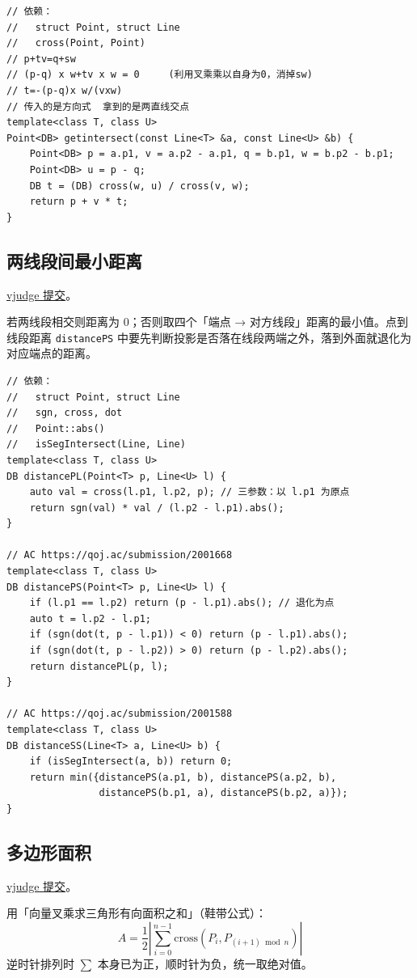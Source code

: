 		\begin{verbatim}
// 依赖：
//   struct Point, struct Line
//   cross(Point, Point)
// p+tv=q+sw
// (p-q) x w+tv x w = 0     (利用叉乘乘以自身为0，消掉sw)
// t=-(p-q)x w/(vxw)
// 传入的是方向式  拿到的是两直线交点
template<class T, class U>
Point<DB> getintersect(const Line<T> &a, const Line<U> &b) {
	Point<DB> p = a.p1, v = a.p2 - a.p1, q = b.p1, w = b.p2 - b.p1;
	Point<DB> u = p - q;
	DB t = (DB) cross(w, u) / cross(v, w);
	return p + v * t;
}
		\end{verbatim}

		\subsection{两线段间最小距离}

		\href{https://vjudge.net/solution/64187931}{vjudge 提交}。

		若两线段相交则距离为 $0$；否则取四个「端点 → 对方线段」距离的最小值。点到线段距离 \texttt{distancePS} 中要先判断投影是否落在线段两端之外，落到外面就退化为对应端点的距离。

		\begin{verbatim}
// 依赖：
//   struct Point, struct Line
//   sgn, cross, dot
//   Point::abs()
//   isSegIntersect(Line, Line)
template<class T, class U>
DB distancePL(Point<T> p, Line<U> l) {
	auto val = cross(l.p1, l.p2, p); // 三参数：以 l.p1 为原点
	return sgn(val) * val / (l.p2 - l.p1).abs();
}

// AC https://qoj.ac/submission/2001668
template<class T, class U>
DB distancePS(Point<T> p, Line<U> l) {
	if (l.p1 == l.p2) return (p - l.p1).abs(); // 退化为点
	auto t = l.p2 - l.p1;
	if (sgn(dot(t, p - l.p1)) < 0) return (p - l.p1).abs();
	if (sgn(dot(t, p - l.p2)) > 0) return (p - l.p2).abs();
	return distancePL(p, l);
}

// AC https://qoj.ac/submission/2001588
template<class T, class U>
DB distanceSS(Line<T> a, Line<U> b) {
	if (isSegIntersect(a, b)) return 0;
	return min({distancePS(a.p1, b), distancePS(a.p2, b),
	            distancePS(b.p1, a), distancePS(b.p2, a)});
}
		\end{verbatim}

		\subsection{多边形面积}

		\href{https://vjudge.net/solution/64207564}{vjudge 提交}。

		用「向量叉乘求三角形有向面积之和」（鞋带公式）：
		$$
		A = \frac{1}{2} \left| \sum_{i=0}^{n-1} \mathrm{cross}(P_i, P_{(i+1) \bmod n}) \right|
		$$
		逆时针排列时 $\sum$ 本身已为正，顺时针为负，统一取绝对值。

